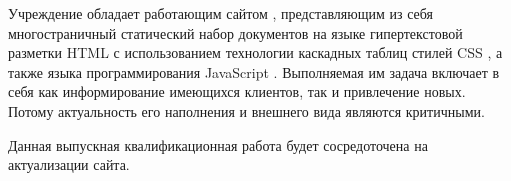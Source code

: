 Учреждение обладает работающим сайтом \cite{meson-uc}, представляющим из себя многостраничный статический набор документов на языке гипертекстовой разметки HTML \cite{wiki-html} с использованием технологии каскадных таблиц стилей CSS \cite{wiki-css}, а также языка программирования JavaScript \cite{wiki-js}.
Выполняемая им задача включает в себя как информирование имеющихся клиентов, так и привлечение новых.
Потому актуальность его наполнения и внешнего вида являются критичными.

\begin{comment}
    Cайт Учреждения уступает современным трендам по нескольким показателям:
    \begin{itemize}
        \item технический -- исполнение содержимого сайта является неактуальным с точки зрения используемых технологий;
        \item функциональный -- возможности, предоставляемые сайтом не соответствуют потребностям Учреждения;
        \item информационный -- часть информации является устаревшей и неактуальной, требует замены;
        \item визуальный -- внешнее оформление сайта не соответствует современным подходам к проектированию и оформлению web-ресурсов.
    \end{itemize}    
\end{comment}

Данная выпускная квалификационная работа будет сосредоточена на актуализации сайта.

\clearpage
